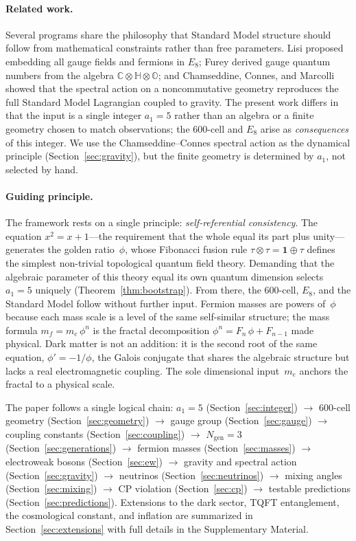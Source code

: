 \documentclass[12pt,a4paper]{article}
\theoremstyle{definition}
\begin{document}
\paragraph{Related work.}
Several programs share the philosophy that Standard Model structure should follow from mathematical constraints rather than free parameters. Lisi \cite{lisi2007} proposed embedding all gauge fields and fermions in $E_8$; Furey \cite{furey2016} derived gauge quantum numbers from the algebra $\mathbb{C} \otimes \mathbb{H} \otimes \mathbb{O}$; and Chamseddine, Connes, and Marcolli \cite{ccm2007} showed that the spectral action on a noncommutative geometry reproduces the full Standard Model Lagrangian coupled to gravity. The present work differs in that the input is a single integer $a_1 = 5$ rather than an algebra or a finite geometry chosen to match observations; the 600-cell and $E_8$ arise as \emph{consequences} of this integer. We use the Chamseddine--Connes spectral action as the dynamical principle (Section~\ref{sec:gravity}), but the finite geometry is determined by $a_1$, not selected by hand.

\paragraph{Guiding principle.}
The framework rests on a single principle: \emph{self-referential consistency}.  The equation $x^2 = x + 1$---the requirement that the whole equal its part plus unity---generates the golden ratio~$\phi$, whose Fibonacci fusion rule $\tau \otimes \tau = \mathbf{1} \oplus \tau$ defines the simplest non-trivial topological quantum field theory.  Demanding that the algebraic parameter of this theory equal its own quantum dimension selects $a_1 = 5$ uniquely (Theorem~\ref{thm:bootstrap}).  From there, the 600-cell, $E_8$, and the Standard Model follow without further input.  Fermion masses are powers of~$\phi$ because each mass scale is a level of the same self-similar structure; the mass formula $m_f = m_e\,\phi^n$ is the fractal decomposition $\phi^n = F_n\,\phi + F_{n-1}$ made physical.  Dark matter is not an addition: it is the second root of the same equation, $\phi' = -1/\phi$, the Galois conjugate that shares the algebraic structure but lacks a real electromagnetic coupling.  The sole dimensional input~$m_e$ anchors the fractal to a physical scale.

The paper follows a single logical chain: $a_1 = 5$ (Section~\ref{sec:integer}) $\to$ 600-cell geometry (Section~\ref{sec:geometry}) $\to$ gauge group (Section~\ref{sec:gauge}) $\to$ coupling constants (Section~\ref{sec:coupling}) $\to$ $N_{\text{gen}} = 3$ (Section~\ref{sec:generations}) $\to$ fermion masses (Section~\ref{sec:masses}) $\to$ electroweak bosons (Section~\ref{sec:ew}) $\to$ gravity and spectral action (Section~\ref{sec:gravity}) $\to$ neutrinos (Section~\ref{sec:neutrinos}) $\to$ mixing angles (Section~\ref{sec:mixing}) $\to$ CP violation (Section~\ref{sec:cp}) $\to$ testable predictions (Section~\ref{sec:predictions}).  Extensions to the dark sector, TQFT entanglement, the cosmological constant, and inflation are summarized in Section~\ref{sec:extensions} with full details in the Supplementary Material.
\end{document}
